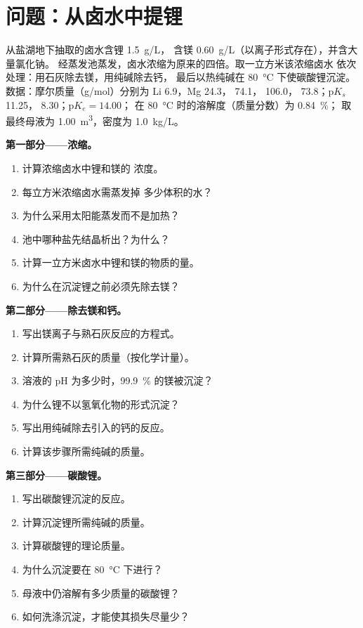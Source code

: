 \section{问题：从卤水中提锂}

\begin{problem}
\label{pb:b1:s-block:1}
从盐湖地下抽取的卤水含锂 \qty{1.5}{g/L}，
含镁 \qty{0.60}{g/L}（以离子形式存在），并含大量氯化钠。
经蒸发池蒸发，卤水浓缩为原来的四倍。取一立方米该浓缩卤水
依次处理：用石灰除去镁，用纯碱除去钙，
最后以热纯碱在 \qty{80}{\celsius} 下使碳酸锂沉淀。
数据：摩尔质量（\unit{g/mol}）分别为 Li 6.9，Mg 24.3，
 74.1， 106.0， 73.8；$\mathrm{p}K_s$
 11.25， 8.30；$\mathrm{p}K_e = 14.00$；
 在 \qty{80}{\celsius} 时的溶解度（质量分数）为 \qty{0.84}{\percent}；
取最终母液为 \qty{1.00}{m^3}，密度为 \qty{1.0}{kg/L}。

\medskip
\noindent\textbf{第一部分——浓缩。}
\begin{enumerate}
  \item 计算浓缩卤水中锂和镁的
        浓度。
  \item 每立方米浓缩卤水需蒸发掉
        多少体积的水？
  \item 为什么采用太阳能蒸发而不是加热？
  \item 池中哪种盐先结晶析出？为什么？
  \item 计算一立方米卤水中锂和镁的物质的量。
  \item 为什么在沉淀锂之前必须先除去镁？
\end{enumerate}

\medskip
\noindent\textbf{第二部分——除去镁和钙。}
\begin{enumerate}[resume]
  \item 写出镁离子与熟石灰反应的方程式。
  \item 计算所需熟石灰的质量（按化学计量）。
  \item 溶液的 pH 为多少时，\qty{99.9}{\percent} 的镁被沉淀？
  \item 为什么锂不以氢氧化物的形式沉淀？
  \item 写出用纯碱除去引入的钙的反应。
  \item 计算该步骤所需纯碱的质量。
\end{enumerate}

\medskip
\noindent\textbf{第三部分——碳酸锂。}
\begin{enumerate}[resume]
  \item 写出碳酸锂沉淀的反应。
  \item 计算沉淀锂所需纯碱的质量。
  \item 计算碳酸锂的理论质量。
  \item 为什么沉淀要在 \qty{80}{\celsius} 下进行？
  \item 母液中仍溶解有多少质量的碳酸锂？
  \item 如何洗涤沉淀，才能使其损失尽量少？
\end{enumerate}


\end{problem}
